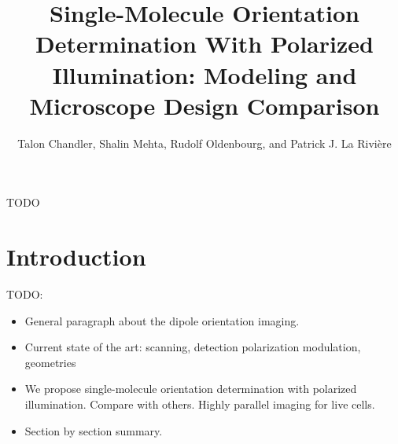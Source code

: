 \documentclass[10pt]{article}
\begin{document}
\title{Single-Molecule Orientation Determination With Polarized Illumination:
  Modeling and Microscope Design Comparison}

\author{Talon Chandler, Shalin Mehta, Rudolf Oldenbourg, and Patrick J. La Rivi\`ere}

\address{University of Chicago, Department of Radiology, Chicago, IL, USA.\\
Marine Biological Laboratory, Bell Center for Regenerative Medicine, Woods Hole, MA, USA.\\
Brown University, Department of Physics, Providence, RI, USA.}

\begin{abstract*}
  TODO
\end{abstract*}






\section{Introduction}
TODO:
  \begin{itemize}
  \item General paragraph about the dipole orientation imaging.
  \item Current state of the art: scanning, detection polarization modulation,
    geometries
  \item We propose single-molecule orientation determination with polarized
    illumination. Compare with others. Highly parallel imaging for live cells.
  \item Section by section summary. 
  \end{itemize}
\end{document}

